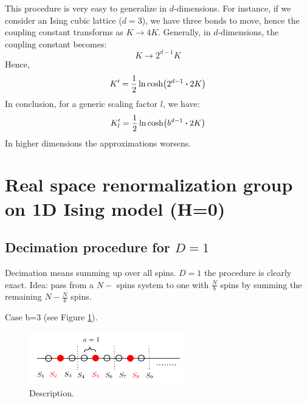 \documentclass[../main/main.tex]{subfiles}
\begin{document}
This procedure is very easy to generalize in \( d \)-dimensions. For instance, if we consider an Ising cubic lattice (\( d=3 \)), we have three bonds to move, hence the coupling constant transforms as \( K \rightarrow 4K \). Generally, in \( d \)-dimensions, the coupling constant becomes:
\begin{equation*}
  K \rightarrow 2^{d-1}  K
\end{equation*}
Hence,
\begin{equation}
  K' = \frac{1}{2} \ln \cosh(2^{d-1} \vdot 2K)
\end{equation}
In conclusion, for a generic scaling factor \( l \), we have:
\begin{equation}
  K_l' = \frac{1}{2} \ln \cosh(b^{d-1} \vdot 2K)
\end{equation}
In higher dimensions the approximations worsens.
























\section{Real space renormalization group on 1D Ising model (H=0)}


\subsection{Decimation procedure for \( D=1 \)}
Decimation means summing up over all spins.
\( D=1 \) the procedure is clearly exact. Idea: pass from a \( N- \) spins system to one with \( \frac{N}{b} \) spins by summing the remaining \( N- \frac{N}{b} \) spins.


Case b=3 (see Figure \ref{fig:20_1}).

\begin{figure}[h!]
\centering
\includegraphics[width=0.6\textwidth]{../lessons/20_image/1.pdf}
\caption{\label{fig:20_1} Description.}
\end{figure}
\end{document}
